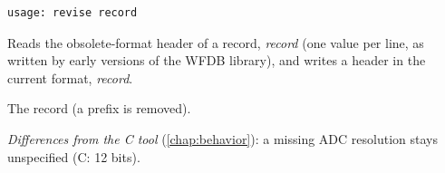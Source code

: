 \begin{lstlisting}[style=signature,language={}]
usage: revise record
\end{lstlisting}
Reads the obsolete-format header of a record, \textit{record} (one value per
line, as written by early versions of the WFDB library), and writes a header in the current
format, \textit{record}.
\begin{params}
\item[record] The record (a  prefix is removed).
\end{params}
\textit{Differences from the C tool} (\cref{chap:behavior}): a missing ADC resolution stays
unspecified (C: 12 bits).

